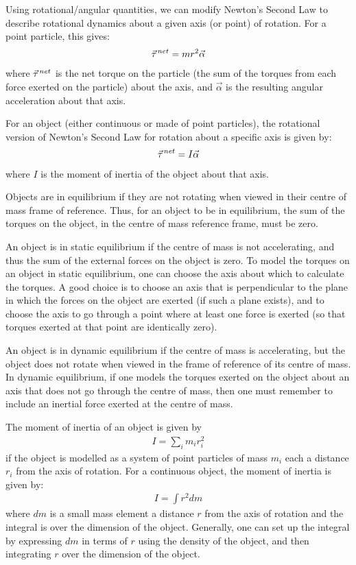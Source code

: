 \begin{chapterSummary}
Using rotational/angular quantities, we can modify Newton's Second Law to describe rotational dynamics about a given axis (or point) of rotation. For a point particle, this gives:
\begin{align*}
\pvec \tau^{net} = mr^2 \vec\alpha
\end{align*}
where $\pvec \tau^{net}$ is the net torque on the particle (the sum of the torques from each force exerted on the particle) about the axis, and $\vec\alpha$ is the resulting angular acceleration about that axis.

For an object (either continuous or made of point particles), the rotational version of Newton's Second Law for rotation about a specific axis is given by:
\begin{align*}
\pvec \tau^{net} = I\vec\alpha
\end{align*} 
where $I$ is the moment of inertia of the object about that axis.

Objects are in equilibrium if they are not rotating when viewed in their centre of mass frame of reference. Thus, for an object to be in equilibrium, the sum of the torques on the object, in the centre of mass reference frame, must be zero.

An object is in static equilibrium if the centre of mass is not accelerating, and thus the sum of the external forces on the object is zero. To model the torques on an object in static equilibrium, one can choose the axis about which to calculate the torques. A good choice is to choose an axis that is perpendicular to the plane in which the forces on the object are exerted (if such a plane exists), and to choose the axis to go through a point where at least one force is exerted (so that torques exerted at that point are identically zero).

An object is in dynamic equilibrium if the centre of mass is accelerating, but the object does not rotate when viewed in the frame of reference of its centre of mass. In dynamic equilibrium, if one models the torques exerted on the object about an axis that does not go through the centre of mass, then one must remember to include an inertial force exerted at the centre of mass. 

The moment of inertia of an object is given by
\begin{align*}
I = \sum_i m_ir_i^2
\end{align*}
if the object is modelled as a system of point particles of mass $m_i$ each a distance $r_i$ from the axis of rotation. For a continuous object, the moment of inertia is given by:
\begin{align*}
I = \int r^2 dm
\end{align*}
where $dm$ is a small mass element a distance $r$ from the axis of rotation and the integral is over the dimension of the object. Generally, one can set up the integral by expressing $dm$ in terms of $r$ using the density of the object, and then integrating $r$ over the dimension of the object.


\end{chapterSummary}
